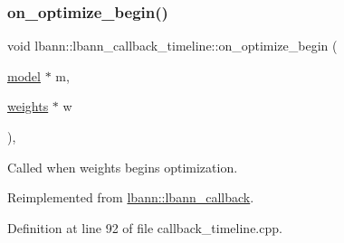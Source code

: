 \subsubsection{\texorpdfstring{on\+\_\+optimize\+\_\+begin()}{on\_optimize\_begin()}}
{\footnotesize\ttfamily void lbann\+::lbann\+\_\+callback\+\_\+timeline\+::on\+\_\+optimize\+\_\+begin (\begin{DoxyParamCaption}\item[{\hyperlink{classlbann_1_1model}{model} $\ast$}]{m,  }\item[{\hyperlink{classlbann_1_1weights}{weights} $\ast$}]{w }\end{DoxyParamCaption})\hspace{0.3cm}{\ttfamily [override]}, {\ttfamily [virtual]}}

Called when weights begins optimization. 

Reimplemented from \hyperlink{classlbann_1_1lbann__callback_a497e750da160e0071ce8864ccc3a1344}{lbann\+::lbann\+\_\+callback}.



Definition at line 92 of file callback\+\_\+timeline.\+cpp.


